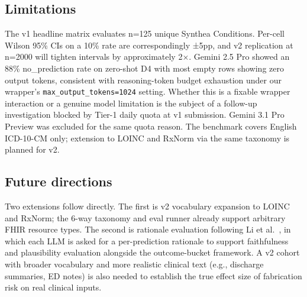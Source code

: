 \subsection{Limitations}\label{limitations}

The v1 headline matrix evaluates n=125 unique Synthea Conditions.
Per-cell Wilson 95\% CIs on a 10\% rate are correspondingly ±5pp,
and v2 replication at n=2000 will tighten intervals by
approximately 2×. Gemini 2.5 Pro showed an 88\% no\_prediction
rate on zero-shot D4 with most empty rows showing zero output
tokens, consistent with reasoning-token budget exhaustion under
our wrapper's \texttt{max\_output\_tokens=1024} setting. Whether this is
a fixable wrapper interaction or a genuine model limitation is
the subject of a follow-up investigation blocked by Tier-1 daily
quota at v1 submission. Gemini 3.1 Pro Preview was excluded for
the same quota reason. The benchmark covers English ICD-10-CM
only; extension to LOINC and RxNorm via the same taxonomy is
planned for v2.

\subsection{Future directions}\label{future-directions}

Two extensions follow directly. The first is v2 vocabulary
expansion to LOINC and RxNorm; the 6-way taxonomy and eval runner
already support arbitrary FHIR resource types. The second is
rationale evaluation following Li et al.~\autocite{Li2025}, in
which each LLM is asked for a per-prediction rationale to support
faithfulness and plausibility evaluation alongside the
outcome-bucket framework. A v2 cohort with broader vocabulary and
more realistic clinical text (e.g., discharge summaries, ED notes)
is also needed to establish the true effect size of fabrication
risk on real clinical inputs.

